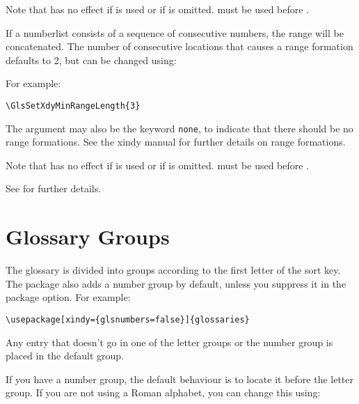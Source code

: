\documentclass[report]{nlctdoc}
\begin{document}
\begin{important}\raggedright
Note that  has no effect if 
 is used or if  is omitted.
 must be used before 
.
\end{important}

If a \gls{numberlist} consists of a sequence of consecutive 
numbers, the range will be concatenated. The 
number of consecutive locations that causes a range formation 
defaults to 2, but can be changed using:
\begin{definition}[\DescribeMacro{\GlsSetXdyMinRangeLength}]
\end{definition}
For example:
\begin{verbatim}
\GlsSetXdyMinRangeLength{3}
\end{verbatim}
The argument may also be the keyword \texttt{none}, to indicate that
there should be no range formations. See the \gls{xindy}
manual for further details on range formations.

\begin{important}
Note that  has no effect if 
is used or if  is omitted.
 must be used before 
.
\end{important}

See  for further details.


\section{Glossary Groups}
\label{sec:groups}

The glossary is divided into groups according to the first
letter of the sort key. The  package also adds
a number group by default, unless you suppress it in the
 package option. For example:
\begin{verbatim}
\usepackage[xindy={glsnumbers=false}]{glossaries}
\end{verbatim}
Any entry that doesn't go in one of the letter groups or the
number group is placed in the default group.

If you have a number group, the default behaviour is to locate
it before the  letter group. If you are not using a
Roman alphabet, you can change this using:

\DescribeMacro{\GlsSetXdyFirstLetterAfterDigits}
\begin{definition}
\end{definition}
\end{document}
